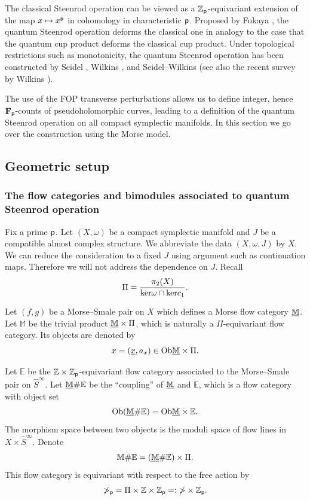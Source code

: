 \documentclass[reqno, 10pt]{amsart}
\numberwithin{equation}{section}
\numberwithin{equation}{section}
\theoremstyle{definition}
\theoremstyle{remark}
\newcommand{\beqn}{\begin{equation*}}
\newcommand{\eeqn}{\end{equation*}}
\newcommand{\mb}{\mathbb}
\newcommand{\p}{{\sf p}}
\newcommand{\fp}{{\bf F}_{\sf p}}
\newcommand{\zp}{{{\mb Z}_{\sf p}}}
\newcommand{\wh}{\widehat}
\newcommand{\uds}[1]{\underline{\smash{#1}}}
\begin{document}
The classical Steenrod operation can be viewed as a $\zp$-equivariant extension of the map $x \mapsto x^\p$ in cohomology in characteristic $\p$. Proposed by Fukaya \cite{Fukaya_Morse}, the quantum Steenrod operation deforms the classical one in analogy to the case that the quantum cup product deforms the classical cup product. Under topological restrictions such as monotonicity, the quantum Steenrod operation has been constructed by Seidel \cite{Seidel_pants}, Wilkins \cite{Wilkins_2020}, and Seidel--Wilkins \cite{Seidel_Wilkins_2022} (see also the recent survey by Wilkins \cite{Wilkins_survey}).

The use of the FOP transverse perturbations allows us to define integer, hence $\fp$-counts of pseudoholomorphic curves, leading to a definition of the quantum Steenrod operation on all compact symplectic manifolds. In this section we go over the construction using the Morse model.

\subsection{Geometric setup}

\subsubsection{The flow categories and bimodules associated to quantum Steenrod operation}

Fix a prime $\p$. Let $(X, \omega)$ be a compact symplectic manifold and $J$ be a compatible almost complex structure. We abbreviate the data $(X, \omega, J)$ by $X$. We can reduce the consideration to a fixed $J$ using argument such as continuation maps. Therefore we will not address the dependence on $J$. Recall
\beqn
\Pi = \frac{\pi_2(X)}{{\rm ker} \omega \cap {\rm ker} c_1}.
\eeqn

Let $(f, g)$ be a Morse--Smale pair on $X$ which defines a Morse flow category $\uds {\mb M}$. Let ${\mb M}$ be the trivial product $\uds {\mb M}\times \Pi$, which is naturally a $\Pi$-equivariant flow category. Its objects are denoted by 
\beqn
x = (\uds x, a_x) \in {\rm Ob}\uds{\mb M}\times \Pi.
\eeqn

Let $\mb{E}$ be the ${\mb Z}\times \zp$-equivariant flow category associated to the Morse--Smale pair on $\wh S^\infty$. Let $\uds {\mb M} \# {\mb E}$ be the ``coupling'' of $\uds {\mb M}$ and ${\mb E}$, which is a flow category with object set
\beqn
{\rm Ob}(\uds {\mb M}\# {\mb E}) = {\rm Ob}\uds {\mb M}\times {\mb E}.
\eeqn
The morphism space between two objects is the moduli space of flow lines in $X \times \wh S^\infty$. Denote
\beqn
\mb{M}\# {\mb E} = (\uds{\mb M}\# {\mb E}) \times \Pi.
\eeqn
This flow category is equivariant with respect to the free action by 
\beqn
\mb\Pi_\p = \Pi \times {\mb Z} \times \zp =: {\mb \Pi} \times {\mb Z}_{\p}.
\eeqn
\end{document}
